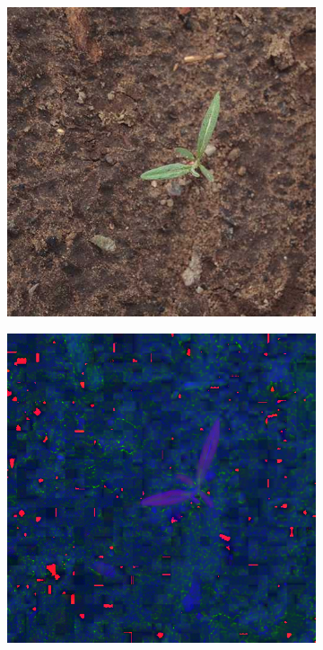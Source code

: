\begin{figure}[H]
    \centering
    \captionsetup[subfigure]{justification=centering}
    \begin{subfigure}[b]{0.3\textwidth}
        \centering
        \includegraphics[width=\textwidth]{./figure/result/segmentation/imgORIGINAL.png}
		\caption{}
		\label{fig:seg_a}
    \end{subfigure}
    \begin{subfigure}[b]{0.3\textwidth}
        \centering
        \includegraphics[width=\textwidth]{./figure/result/segmentation/imgHSI.png}

\end{subfigure}
\end{figure}
